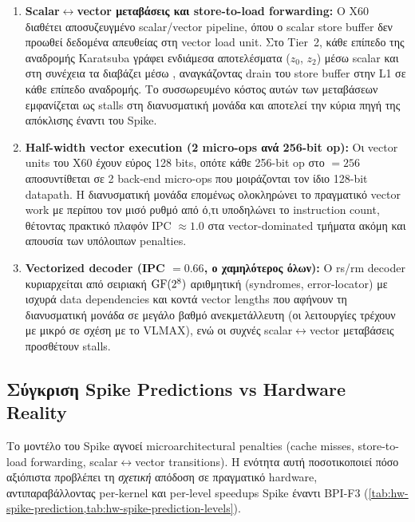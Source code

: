 \begin{enumerate}
  \item \textbf{Scalar$\leftrightarrow$vector μεταβάσεις και store-to-load forwarding:} Ο X60
    διαθέτει αποσυζευγμένο scalar/vector pipeline, όπου ο scalar store buffer
    δεν προωθεί δεδομένα απευθείας στη vector load unit. Στο Tier~2, κάθε
    επίπεδο της αναδρομής Karatsuba γράφει ενδιάμεσα αποτελέσματα ($z_0$, $z_2$)
    μέσω scalar  και στη συνέχεια τα διαβάζει μέσω ,
    αναγκάζοντας drain του store buffer στην L1 σε κάθε επίπεδο αναδρομής. Το
    συσσωρευμένο κόστος αυτών των μεταβάσεων εμφανίζεται ως stalls στη
    διανυσματική μονάδα και αποτελεί την κύρια πηγή της απόκλισης έναντι του Spike.

  \item \textbf{Half-width vector execution (2 micro-ops ανά \num{256}-bit op):}
    Οι vector units του X60 έχουν εύρος \num{128} bits, οπότε κάθε \num{256}-bit
    \RVV op στο \VLEN$= \num{256}$ αποσυντίθεται σε \num{2} back-end micro-ops
    που μοιράζονται τον ίδιο 128-bit datapath. Η διανυσματική μονάδα επομένως
    ολοκληρώνει το πραγματικό vector work με περίπου τον μισό ρυθμό από ό,τι
    υποδηλώνει το instruction count, θέτοντας πρακτικό πλαφόν IPC $\approx 1.0$
    στα vector-dominated τμήματα ακόμη και απουσία των υπόλοιπων penalties.

  \item \textbf{Vectorized decoder (IPC $= 0.66$, ο χαμηλότερος όλων):} Ο
    \gls{rs}/\gls{rm} decoder κυριαρχείται από σειριακή $\mathrm{GF}(2^8)$ αριθμητική
    (syndromes, error-locator) με ισχυρά data dependencies και κοντά vector
    lengths που αφήνουν τη διανυσματική μονάδα σε μεγάλο βαθμό ανεκμετάλλευτη
    (οι λειτουργίες τρέχουν με μικρό  σε σχέση με το VLMAX), ενώ οι
    συχνές scalar$\leftrightarrow$vector μεταβάσεις προσθέτουν stalls.
\end{enumerate}

\subsection{Σύγκριση Spike Predictions vs Hardware Reality}
\label{ssec:hw-spike-vs-hw}

Το μοντέλο του Spike αγνοεί microarchitectural penalties (cache
misses, store-to-load forwarding, scalar$\leftrightarrow$vector transitions).
Η ενότητα αυτή ποσοτικοποιεί πόσο αξιόπιστα προβλέπει τη \emph{σχετική}
απόδοση σε πραγματικό hardware, αντιπαραβάλλοντας per-kernel και per-level
speedups Spike έναντι BPI-F3
(\cref{tab:hw-spike-prediction,tab:hw-spike-prediction-levels}).

